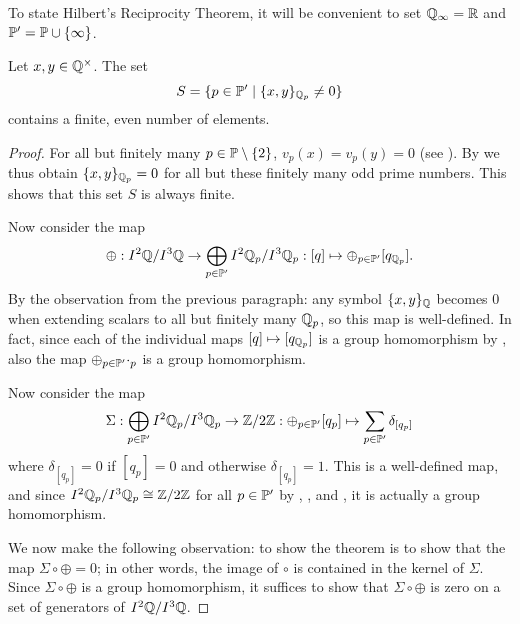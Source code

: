 \documentclass[12pt, leqno, british]{amsart}
\begin{document}
To state Hilbert's Reciprocity Theorem, it will be convenient to set $\mathbb Q_{\infty} = \mathbb R$ and $\mathbb P' = \mathbb P \cup \lbrace \infty \rbrace$.
\begin{thm}\label{T:HilbertReciprocity}
Let $x, y \in \mathbb Q^\times$.
The set
$$ S = \lbrace p \in \mathbb P' \mid \lbrace x, y \rbrace_{\mathbb Q_p} \neq 0 \rbrace$$
contains a finite, even number of elements.
\end{thm}
\begin{proof}
For all but finitely many $p \in \mathbb P \setminus \lbrace 2 \rbrace$, $v_p(x) = v_p(y) = 0$ (see ).
By  we thus obtain $\lbrace x, y \rbrace_{\mathbb Q_p} = 0$ for all but these finitely many odd prime numbers.
This shows that this set $S$ is always finite.

Now consider the map
\begin{displaymath}
\oplus : I^2\mathbb Q /I^3\mathbb Q \to \bigoplus_{p \in \mathbb P'} I^2\mathbb Q_p/I^3\mathbb Q_p : [q] \mapsto \oplus_{p \in \mathbb P'} [q_{\mathbb Q_p}].
\end{displaymath}
By the observation from the previous paragraph: any symbol $\lbrace x, y \rbrace_{\mathbb Q}$ becomes $0$ when extending scalars to all but finitely many $\mathbb Q_p$, so this map is well-defined.
In fact, since each of the individual maps $[q] \mapsto [q_{\mathbb Q_p}]$ is a group homomorphism by , also the map $\oplus_{p \in \mathbb P'}\cdot_p$ is a group homomorphism.

Now consider the map
\begin{displaymath}
\Sigma : \bigoplus_{p \in \mathbb P'} I^2\mathbb Q_p/I^3\mathbb Q_p \to \mathbb Z/2\mathbb Z : \oplus_{p \in \mathbb P'} [q_p] \mapsto \sum_{p \in \mathbb P'} \delta_{[q_p]}
\end{displaymath}
where $\delta_{[q_p]} = 0$ if $[q_p] = 0$ and otherwise $\delta_{[q_p]} = 1$.
This is a well-defined map, and since $I^2\mathbb Q_p/I^3\mathbb Q_p \cong \mathbb Z/2\mathbb Z$ for all $p \in \mathbb P'$ by , , and , it is actually a group homomorphism.

We now make the following observation: to show the theorem is to show that the map $\Sigma \circ \oplus = 0$; in other words, the image of $\circ$ is contained in the kernel of $\Sigma$.
Since $\Sigma \circ \oplus$ is a group homomorphism, it suffices to show that $\Sigma \circ \oplus$ is zero on a set of generators of $I^2\mathbb Q/I^3\mathbb Q$.


\end{proof}
\end{document}
